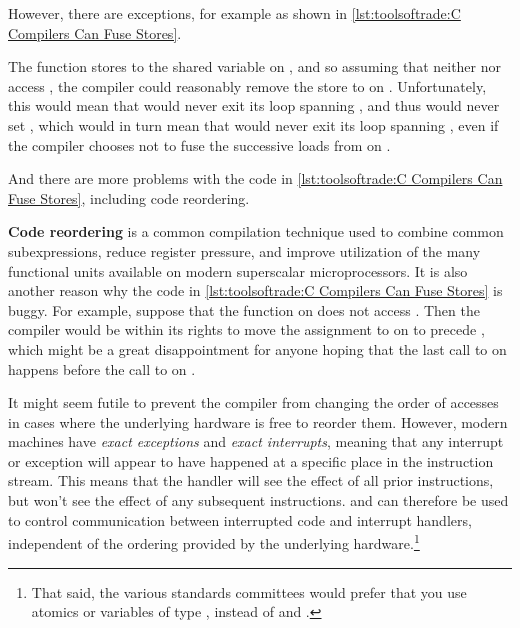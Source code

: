 However, there are exceptions, for example as shown in
\cref{lst:toolsoftrade:C Compilers Can Fuse Stores}.
\begin{fcvref}
The function  stores to the shared
variable  on ,
and so assuming that neither
 nor  access ,
the compiler could reasonably remove the store to  on
.
Unfortunately, this would mean that  would
never exit its loop spanning
, and thus would never set
, which would in turn mean that 
would never exit its loop spanning
, even if
the compiler chooses not to fuse the successive loads from
 on .

And there are more problems with the code in
\cref{lst:toolsoftrade:C Compilers Can Fuse Stores},
including code reordering.

{\bf Code reordering} is a common compilation technique used to
combine common subexpressions, reduce register pressure, and
improve utilization of the many functional units available on
modern superscalar microprocessors.
It is also another reason why the code in
\cref{lst:toolsoftrade:C Compilers Can Fuse Stores}
is buggy.
For example, suppose that the  function on
does not access .
Then the compiler would be within its rights to move the assignment
to  on
 to precede , which might
be a great disappointment for anyone hoping that the last call to
 on  happens before the call to
 on .
\end{fcvref}

It might seem futile to prevent the compiler from changing the order of
accesses in cases where the underlying hardware is free to reorder them.
However, modern machines have \emph{exact exceptions} and
\emph{exact interrupts}, meaning that any interrupt or exception will
appear to have happened at a specific place in the instruction
stream.
This means that the handler will see the effect of all prior
instructions, but won't see the effect of any subsequent instructions.
 and  can therefore be used to
control communication between interrupted code and interrupt handlers,
independent of the ordering provided by the underlying hardware.\footnote{
	That said, the various standards committees would prefer that
	you use atomics or variables of type , instead
	of  and .}

